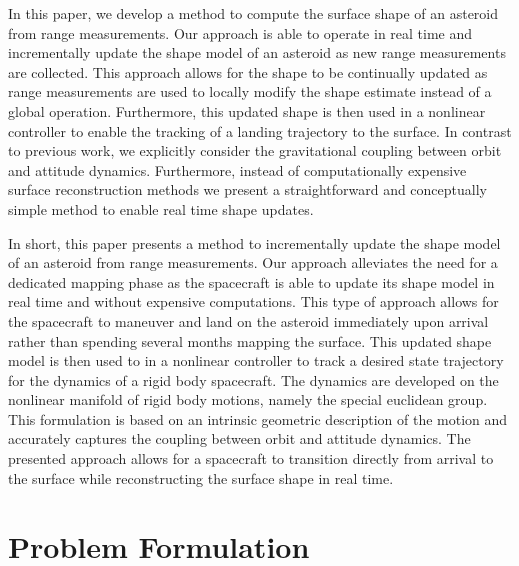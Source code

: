 \documentclass[letterpaper, paper,11pt]{AAS}		%
\begin{document}
In this paper, we develop a method to compute the surface shape of an asteroid from range measurements.
Our approach is able to operate in real time and incrementally update the shape model of an asteroid as new range measurements are collected.
This approach allows for the shape to be continually updated as range measurements are used to locally modify the shape estimate instead of a global operation.
Furthermore, this updated shape is then used in a nonlinear controller to enable the tracking of a landing trajectory to the surface.
In contrast to previous work, we explicitly consider the gravitational coupling between orbit and attitude dynamics.
Furthermore, instead of computationally expensive surface reconstruction methods we present a straightforward and conceptually simple method to enable real time shape updates. 



In short, this paper presents a method to incrementally update the shape  model of an asteroid from range measurements. 
Our approach alleviates the need for a dedicated mapping phase as the spacecraft is able to update its shape model in real time and without expensive computations.
This type of approach allows for the spacecraft to maneuver and land on the asteroid immediately upon arrival rather than spending several months mapping the surface.
This updated shape model is then used to in a nonlinear controller to track a desired state trajectory for the dynamics of a rigid body spacecraft.
The dynamics are developed on the nonlinear manifold of rigid body motions, namely the special euclidean group.
This formulation is based on an intrinsic geometric description of the motion and accurately captures the coupling between orbit and attitude dynamics. 
The presented approach allows for a spacecraft to transition directly from arrival to the surface while reconstructing the surface shape in real time.


\section{Problem Formulation}\label{sec:problem}
\end{document}
